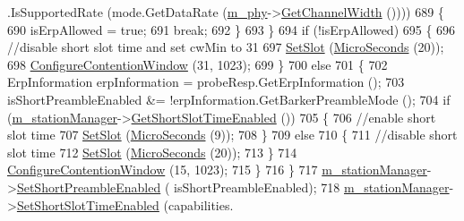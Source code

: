 \begin{DoxyCode}
      .IsSupportedRate (mode.GetDataRate (\hyperlink{classns3_1_1RegularWifiMac_a1a6dad8eb0a057a4e1b459f518457a4c}{m\_phy}->\hyperlink{classns3_1_1WifiPhy_a4a5d5009b3b3308f2baeed42a2007189}{GetChannelWidth} ())))
689                     \{
690                       isErpAllowed = \textcolor{keyword}{true};
691                       \textcolor{keywordflow}{break};
692                     \}
693                 \}
694               \textcolor{keywordflow}{if} (!isErpAllowed)
695                 \{
696                   \textcolor{comment}{//disable short slot time and set cwMin to 31}
697                   \hyperlink{classns3_1_1RegularWifiMac_a71241af3585e17c102e51576f19a49b9}{SetSlot} (\hyperlink{group__timecivil_ga17465a639c8d1464e76538afdd78a9f0}{MicroSeconds} (20));
698                   \hyperlink{classns3_1_1RegularWifiMac_aa6da62735de3b3aaa10f713a8832c3c6}{ConfigureContentionWindow} (31, 1023);
699                 \}
700               \textcolor{keywordflow}{else}
701                 \{
702                   ErpInformation erpInformation = probeResp.GetErpInformation ();
703                   isShortPreambleEnabled &= !erpInformation.GetBarkerPreambleMode ();
704                   \textcolor{keywordflow}{if} (\hyperlink{classns3_1_1RegularWifiMac_a76d1a5e27b64bfe36f24a55d1eea2775}{m\_stationManager}->\hyperlink{classns3_1_1WifiRemoteStationManager_abbcfcdce410a9673dbdf18a9d7614f8c}{GetShortSlotTimeEnabled} ())
705                     \{
706                       \textcolor{comment}{//enable short slot time}
707                       \hyperlink{classns3_1_1RegularWifiMac_a71241af3585e17c102e51576f19a49b9}{SetSlot} (\hyperlink{group__timecivil_ga17465a639c8d1464e76538afdd78a9f0}{MicroSeconds} (9));
708                     \}
709                   \textcolor{keywordflow}{else}
710                     \{
711                       \textcolor{comment}{//disable short slot time}
712                       \hyperlink{classns3_1_1RegularWifiMac_a71241af3585e17c102e51576f19a49b9}{SetSlot} (\hyperlink{group__timecivil_ga17465a639c8d1464e76538afdd78a9f0}{MicroSeconds} (20));
713                     \}
714                   \hyperlink{classns3_1_1RegularWifiMac_aa6da62735de3b3aaa10f713a8832c3c6}{ConfigureContentionWindow} (15, 1023);
715                 \}
716             \}
717           \hyperlink{classns3_1_1RegularWifiMac_a76d1a5e27b64bfe36f24a55d1eea2775}{m\_stationManager}->\hyperlink{classns3_1_1WifiRemoteStationManager_a66a2f347bbc24c14a38da8dc56781cc8}{SetShortPreambleEnabled} (
      isShortPreambleEnabled);
718           \hyperlink{classns3_1_1RegularWifiMac_a76d1a5e27b64bfe36f24a55d1eea2775}{m\_stationManager}->\hyperlink{classns3_1_1WifiRemoteStationManager_a127fb3ed96ad66f647c1fa3dc616e274}{SetShortSlotTimeEnabled} (capabilities.

\end{DoxyCode}
